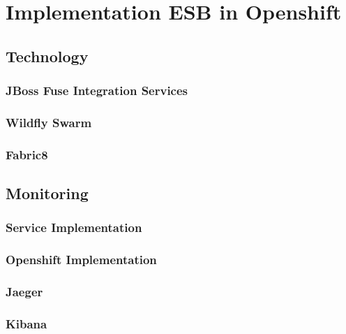 \chapter{Implementation ESB in Openshift}
\label{cha:esbi}

\section{Technology}
\label{sec:esbi-technolody-fis}

\subsection{JBoss Fuse Integration Services}
\label{sec:esbi-technology-fis}

\subsection{Wildfly Swarm}
\label{sec:esbi-technology-swarm}

\subsection{Fabric8}
\label{sec:esbi-technology-f8}

\section{Monitoring}
\label{sec:esbi-monitoring}

\subsection{Service Implementation}
\label{sec:esbi-minitoring-service}

\subsection{Openshift Implementation}
\label{sec:esbi-minitoring-openshift}

\subsection{Jaeger}
\label{sec:esbi-minitoring-jaeger}

\subsection{Kibana}
\label{sec:esbi-minitoring-kibana}

